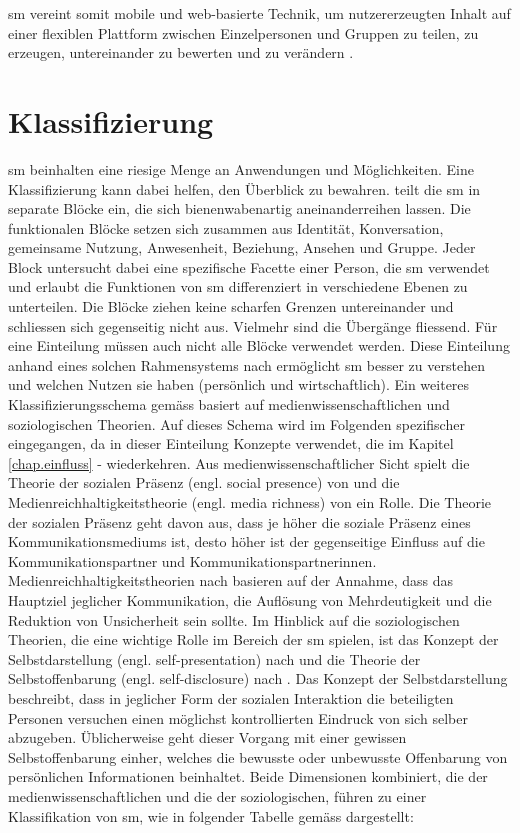 \gls{sm} vereint somit mobile und web-basierte Technik, um nutzererzeugten Inhalt auf einer flexiblen Plattform zwischen Einzelpersonen und Gruppen zu teilen, zu erzeugen, untereinander zu bewerten und zu verändern \cite{Kietzmann:2011}.
 
\section{Klassifizierung}\label{sec.klassifiezierung}
\gls{sm} beinhalten eine riesige Menge an Anwendungen und Möglichkeiten. Eine Klassifizierung kann dabei helfen, den Überblick zu bewahren.  teilt die \gls{sm} in separate Blöcke ein, die sich bienenwabenartig aneinanderreihen lassen. Die funktionalen Blöcke setzen sich zusammen aus Identität, Konversation, gemeinsame Nutzung, Anwesenheit, Beziehung, Ansehen und Gruppe. Jeder Block untersucht dabei eine spezifische Facette einer Person, die \gls{sm} verwendet und erlaubt die Funktionen von \gls{sm} differenziert in verschiedene Ebenen zu unterteilen. Die Blöcke ziehen keine scharfen Grenzen untereinander und schliessen sich gegenseitig nicht aus. Vielmehr sind die Übergänge fliessend. Für eine Einteilung müssen auch nicht alle Blöcke verwendet werden. Diese Einteilung anhand eines solchen Rahmensystems nach \citeauthor{Kietzmann:2011} ermöglicht \gls{sm} besser zu verstehen und welchen Nutzen sie haben (persönlich und wirtschaftlich). \newline
Ein weiteres Klassifizierungsschema gemäss  basiert auf medienwissenschaftlichen und soziologischen Theorien. Auf dieses Schema wird im Folgenden spezifischer eingegangen, da in dieser Einteilung Konzepte verwendet, die im Kapitel \ref{chap.einfluss} -  wiederkehren. Aus medienwissenschaftlicher Sicht spielt die Theorie der sozialen Präsenz (engl. social presence) von  und die Medienreichhaltigkeitstheorie (engl. media richness) von  ein Rolle. Die Theorie der sozialen Präsenz geht davon aus, dass je höher die soziale Präsenz eines Kommunikationsmediums ist, desto höher ist der gegenseitige Einfluss auf die Kommunikationspartner und Kommunikationspartnerinnen. Medienreichhaltigkeitstheorien nach  basieren auf der Annahme, dass das Hauptziel jeglicher Kommunikation, die Auflösung von Mehrdeutigkeit und die Reduktion von Unsicherheit sein sollte. Im Hinblick auf die soziologischen Theorien, die eine wichtige Rolle im Bereich der \gls{sm} spielen, ist das Konzept der Selbstdarstellung (engl. self-presentation) nach  und die Theorie der Selbstoffenbarung (engl. self-disclosure) nach . Das Konzept der Selbstdarstellung beschreibt, dass in jeglicher Form der sozialen Interaktion die beteiligten Personen versuchen einen möglichst kontrollierten Eindruck von sich selber abzugeben. Üblicherweise geht dieser Vorgang mit einer gewissen Selbstoffenbarung einher, welches die bewusste oder unbewusste Offenbarung von persönlichen Informationen beinhaltet. Beide Dimensionen kombiniert, die der medienwissenschaftlichen und die der soziologischen,  führen zu einer Klassifikation von \gls{sm}, wie in folgender Tabelle gemäss  dargestellt:	
